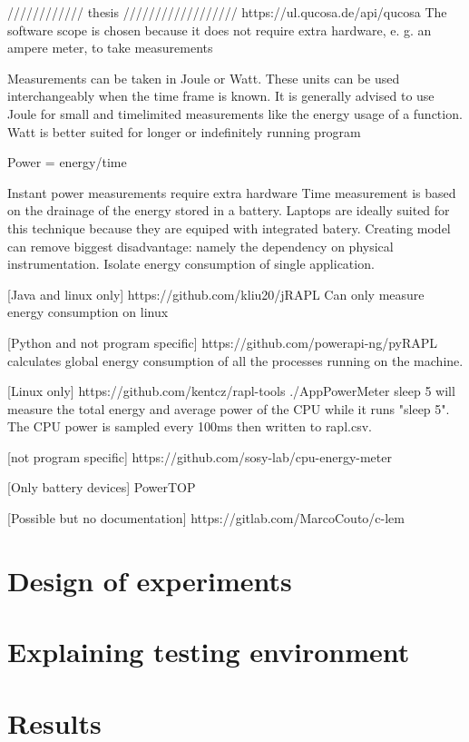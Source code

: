 \documentclass[../thesis.tex]{subfiles}
\begin{document}
//////////// thesis //////////////////
https://ul.qucosa.de/api/qucosa%
The software scope is chosen because it does not require extra hardware,
e. g. an ampere meter, to take measurements

Measurements can be taken in Joule or Watt. These units can be used interchangeably
when the time frame is known. It is generally advised to use Joule for small and timelimited measurements like the energy usage of a function. Watt is better suited for
longer or indefinitely running program

Power = energy/time

Instant power measurements require extra hardware
Time measurement is based on the drainage of the energy stored in a battery. Laptops are ideally suited for this technique because they are equiped with integrated batery.
Creating model can remove biggest disadvantage: namely the dependency on physical instrumentation. Isolate energy consumption of single application.  

[Java and linux only]
https://github.com/kliu20/jRAPL
Can only measure energy consumption on linux

[Python and not program specific]
https://github.com/powerapi-ng/pyRAPL
calculates global energy consumption of all the processes running on the machine. 

[Linux only]
https://github.com/kentcz/rapl-tools
./AppPowerMeter sleep 5
will measure the total energy and average power of the CPU while it runs "sleep 5". The CPU power is sampled every 100ms then written to rapl.csv.

[not program specific]
https://github.com/sosy-lab/cpu-energy-meter

[Only battery devices]
PowerTOP

[Possible but no documentation]
https://gitlab.com/MarcoCouto/c-lem
\section{Design of experiments}
\section{Explaining testing environment}
\section{Results}
\end{document}

